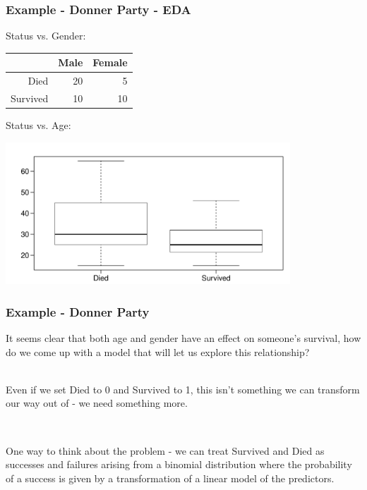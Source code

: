 \begin{frame}
\frametitle{Example - Donner Party - EDA}

Status vs. Gender:\\

\begin{center}
\begin{tabular}{rrr}
\hline
         & Male & Female \\ 
\hline
Died     &  20  &   5 \\ 
Survived &  10  &  10 \\ 
   \hline
\end{tabular}
\end{center}

\pause 
\vfill

Status vs. Age:\\
\begin{center}
\includegraphics[width=0.8\textwidth]{9-5_logistic_reg/figures/donner/status_age}
\end{center}

\end{frame}


\begin{frame}
\frametitle{Example - Donner Party}

It seems clear that both age and gender have an effect on someone's survival, how do we come up with a model that will let us explore this relationship?\\

~\\ \pause

Even if we set Died to 0 and Survived to 1, this isn't something we can transform our way out of - we need something more.

~\\ \pause

One way to think about the problem - we can treat Survived and Died as successes and failures arising from a binomial distribution where the probability of a success is given by a transformation of a linear model of the predictors.

\end{frame}

